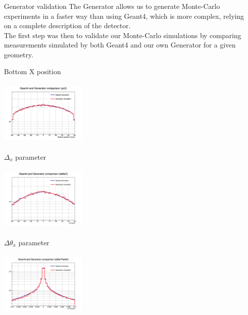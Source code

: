 \documentclass[handout,8 pt]{beamer}
\begin{document}
\begin{frame}{Generator validation}
\justifying
The Generator allows us to generate Monte-Carlo experiments in a faster way than using Geant4, which is more complex, relying on a complete description of the detector. \\ \vspace{10pt}
The first step was then to validate our Monte-Carlo simulations by comparing measurements simulated by both Geant4 and our own Generator for a given geometry. \vfill

\begin{minipage}[c]{.32\textwidth}
\begin{exampleblock}{} \begin{center}Bottom X position\end{center} \end{exampleblock}
\includegraphics[width=4.2cm, height=3.2cm]{figs/px2-17p2vs17p2.png} 
\end{minipage}
\begin{minipage}[c]{.32\textwidth}
\begin{exampleblock}{} \begin{center}$\Delta_x$ parameter\end{center} \end{exampleblock}
\includegraphics[width=4.2cm, height=3.2cm]{figs/deltaX-17p2vs17p2.png}
\end{minipage}
\begin{minipage}[c]{.32\textwidth}
\begin{exampleblock}{} \begin{center}$\Delta \theta_x$ parameter\end{center} \end{exampleblock}
\includegraphics[width=4.2cm, height=3.2cm]{figs/deltaThetaX-17p2vs17p2.png}
\end{minipage}

\end{frame}
\end{document}
